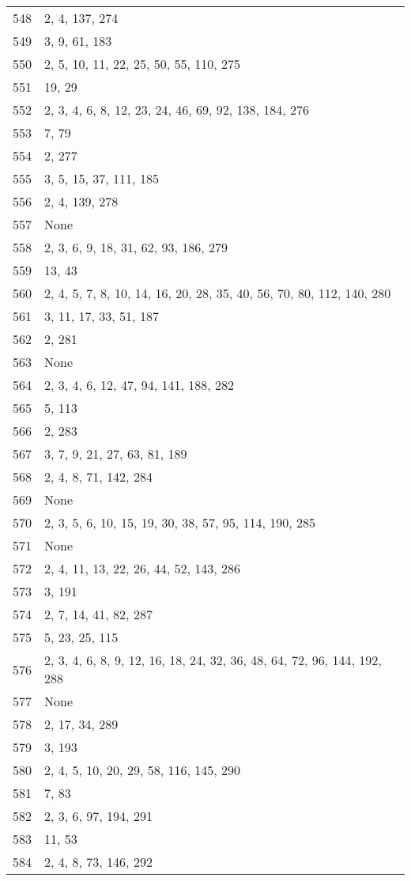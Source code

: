 \documentclass[12pt]{article}
\begin{document}
\begin{tabular}{|r|l|}
548 & 2, 4, 137, 274 \\ 
549 & 3, 9, 61, 183 \\ 
550 & 2, 5, 10, 11, 22, 25, 50, 55, 110, 275 \\ 
551 & 19, 29 \\ 
552 & 2, 3, 4, 6, 8, 12, 23, 24,  46, 69, 92, 138, 184, 276 \\ 
553 & 7, 79 \\ 
554 & 2, 277 \\ 
555 & 3, 5, 15, 37, 111, 185 \\ 
556 & 2, 4, 139, 278 \\ 
557 & None \\ 
558 & 2, 3, 6, 9, 18,  31, 62, 93, 186, 279 \\ 
559 & 13, 43 \\ 
560 & 2, 4, 5, 7, 8, 10, 14, 16, 20, 28, 35, 40, 56, 70, 80, 112, 140, 280 \\ 
561 & 3, 11, 17, 33, 51, 187 \\ 
562 & 2, 281 \\ 
563 & None \\ 
564 & 2, 3, 4, 6, 12, 47, 94, 141, 188, 282 \\ 
565 & 5, 113 \\ 
566 & 2, 283 \\ 
567 & 3, 7, 9, 21, 27, 63, 81, 189 \\ 
568 & 2, 4, 8, 71, 142, 284 \\ 
569 & None \\ 
570 & 2, 3, 5, 6, 10, 15, 19,  30, 38, 57, 95, 114, 190, 285 \\ 
571 & None \\ 
572 & 2,  4, 11, 13, 22, 26, 44, 52, 143, 286 \\ 
573 & 3, 191 \\ 
574 & 2, 7, 14, 41, 82, 287 \\ 
575 & 5, 23, 25, 115 \\ 
576 & 2, 3, 4, 6,  8, 9, 12, 16, 18, 24, 32, 36, 48,  64, 72, 96, 144, 192, 288 \\ 
577 & None \\ 
578 & 2, 17, 34, 289 \\ 
579 & 3, 193 \\ 
580 & 2, 4, 5, 10, 20, 29, 58, 116, 145, 290 \\ 
581 & 7, 83 \\ 
582 & 2, 3, 6, 97, 194, 291 \\ 
583 & 11, 53 \\ 
584 & 2, 4, 8, 73, 146, 292 \\ 

\end{tabular}
\end{document}
